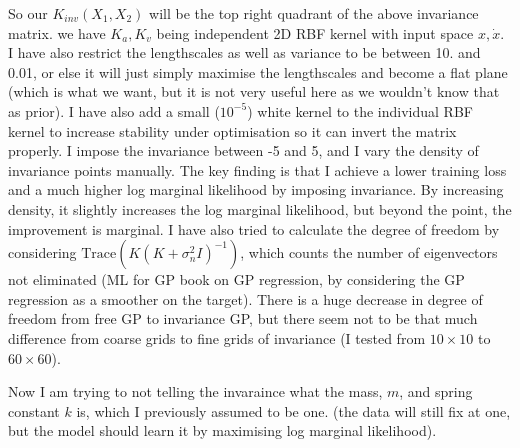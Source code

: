 \documentclass{article}
\begin{document}
So our $K_{inv}(X_1, X_2)$ will be the top right quadrant of the above invariance matrix. 
we have $K_a, K_v$ being independent 2D RBF kernel with input space $x, \dot{x}.$
I have also restrict the lengthscales as well as variance to be between 10. and 0.01, or else it will just simply maximise the lengthscales and become a flat plane (which is what we want, but it is not very useful here as we wouldn't know that as prior).
I have also add a small ($10^{-5}$) white kernel to the individual RBF kernel to increase stability under optimisation so it can invert the matrix properly. 
I impose the invariance between -5 and 5, and I vary the density of invariance points manually. 
The key finding is that I achieve a lower training loss and a much higher log marginal likelihood by imposing invariance. 
By increasing density, it slightly increases the log marginal likelihood, but beyond the point, the improvement is marginal.
I have also tried to calculate the degree of freedom by considering $\mathrm{Trace}(K(K+\sigma^2_nI)^{-1})$, which counts the number of eigenvectors not eliminated (ML for GP book on GP regression, by considering the GP regression as a smoother on the target). 
There is a huge decrease in degree of freedom from free GP to invariance GP, but there seem not to be that much difference from coarse grids to fine grids of invariance (I tested from $10\times 10$ to $60\times 60$).

Now I am trying to not telling the invaraince what the mass, $m$, and spring constant $k$ is, which I previously assumed to be one. (the data will still fix at one, but the model should learn it by maximising log marginal likelihood).
\end{document}
